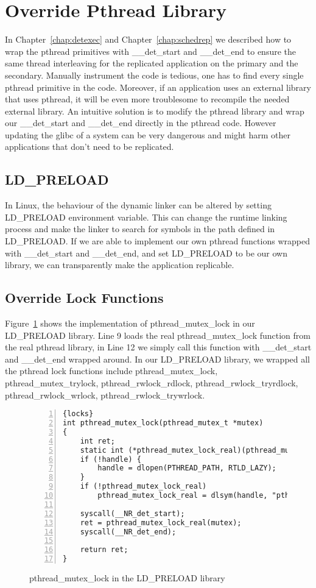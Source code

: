 \section{Override Pthread Library}
In Chapter~\ref{chap:detexec} and Chapter~\ref{chap:schedrep} we described how to wrap the pthread primitives with \_\_det\_start and \_\_det\_end to ensure the same thread interleaving for the replicated application on the primary and the secondary. Manually instrument the code is tedious, one has to find every single pthread primitive in the code. Moreover, if an application uses an external library that uses pthread, it will be even more troublesome to recompile the needed external library. An intuitive solution is to modify the pthread library and wrap our \_\_det\_start and \_\_det\_end directly in the pthread code. However updating the glibc of a system can be very dangerous and might harm other applications that don't need to be replicated.

\subsection{LD\_PRELOAD}
In Linux, the behaviour of the dynamic linker can be altered by setting LD\_PRELOAD environment variable. This can change the runtime linking process and make the linker to search for symbols in the path defined in LD\_PRELOAD. If we are able to implement our own pthread functions wrapped with \_\_det\_start and \_\_det\_end, and set LD\_PRELOAD to be our own library, we can transparently make the application replicable.

\subsection{Override Lock Functions}

Figure~\ref{f:orverridelocks} shows the implementation of pthread\_mutex\_lock in our LD\_PRELOAD library. Line 9 loads the real pthread\_mutex\_lock function from the real pthread library, in Line 12 we simply call this function with \_\_det\_start and \_\_det\_end wrapped around. In our LD\_PRELOAD library, we wrapped all the pthread lock functions include pthread\_mutex\_lock, pthread\_mutex\_trylock, pthread\_rwlock\_rdlock, pthread\_rwlock\_tryrdlock, pthread\_rwlock\_wrlock, pthread\_rwlock\_trywrlock.

\begin{figure}
\begin{lstlisting}[numbers=left, frame=single, basicstyle=\small, breaklines]{locks}
int pthread_mutex_lock(pthread_mutex_t *mutex)
{
    int ret;
    static int (*pthread_mutex_lock_real)(pthread_mutex_t *mutex) = NULL;    
    if (!handle) {
        handle = dlopen(PTHREAD_PATH, RTLD_LAZY);
    }
    if (!pthread_mutex_lock_real)
        pthread_mutex_lock_real = dlsym(handle, "pthread_mutex_lock");

    syscall(__NR_det_start);
    ret = pthread_mutex_lock_real(mutex);
    syscall(__NR_det_end);

    return ret;
}
\end{lstlisting}
\caption{pthread\_mutex\_lock in the LD\_PRELOAD library}
\label{f:orverridelocks}
\end{figure}


